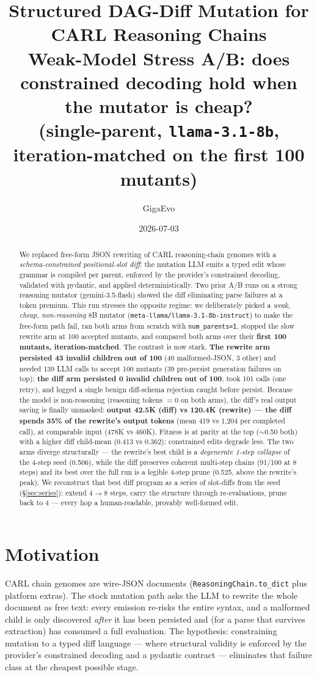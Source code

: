 \documentclass[11pt]{article}
\title{\color{accent}\bfseries Structured DAG-Diff Mutation for CARL Reasoning Chains\\
\large Weak-Model Stress A/B: does constrained decoding hold when the mutator is cheap?\\
\large (single-parent, \texttt{llama-3.1-8b}, iteration-matched on the first 100 mutants)}
\author{GigaEvo}
\date{2026-07-03}
\begin{document}
\maketitle

\begin{abstract}
\noindent
We replaced free-form JSON rewriting of CARL reasoning-chain genomes with a
\emph{schema-constrained positional-slot diff}: the mutation LLM emits a typed edit whose
grammar is compiled per parent, enforced by the provider's constrained decoding, validated
with pydantic, and applied deterministically. Two prior A/B runs on a strong reasoning
mutator (gemini-3.5-flash) showed the diff eliminating parse failures at a token premium.
This run stresses the opposite regime: we deliberately picked a \emph{weak, cheap,
non-reasoning} 8B mutator (\texttt{meta-llama/llama-3.1-8b-instruct}) to make the free-form
path fail, ran both arms from scratch with \texttt{num\_parents=1}, stopped the slow rewrite
arm at 100 accepted mutants, and compared both arms over their \textbf{first 100 mutants,
iteration-matched}. The contrast is now stark. \textbf{The rewrite arm persisted 43 invalid
children out of 100} (40 malformed-JSON, 3 other) and needed 139 LLM calls to accept 100
mutants (39 pre-persist generation failures on top); \textbf{the diff arm persisted 0 invalid
children out of 100}, took 101 calls (one retry), and logged a single benign
diff-schema rejection caught before persist. Because the model is non-reasoning
(reasoning tokens $=0$ on both arms), the diff's real output saving is finally unmasked:
\textbf{output 42.5K (diff) vs 120.4K (rewrite) --- the diff spends 35\% of the rewrite's
output tokens} (mean 419 vs 1{,}204 per completed call), at comparable input (478K vs 460K).
Fitness is at parity at the top ($\sim$0.50 both) with a higher diff child-mean (0.413 vs
0.362): constrained edits degrade less. The two arms diverge structurally --- the rewrite's
best child is a \emph{degenerate 1-step collapse} of the 4-step seed (0.506), while the diff
preserves coherent multi-step chains (91/100 at 8 steps) and its best over the full run is a
legible 4-step prune (0.525, above the rewrite's peak). We reconstruct that best diff program
as a series of slot-diffs from the seed (\S\ref{sec:series}): extend $4\!\to\!8$ steps, carry
the structure through re-evaluations, prune back to 4 --- every hop a human-readable, provably
well-formed edit.
\end{abstract}

\section{Motivation}
CARL chain genomes are wire-JSON documents (\texttt{ReasoningChain.to\_dict} plus platform
extras). The stock mutation path asks the LLM to rewrite the whole document as free text:
every emission re-risks the entire syntax, and a malformed child is only discovered
\emph{after} it has been persisted and (for a parse that survives extraction) has consumed a
full evaluation. The hypothesis: constraining mutation to a typed diff language --- where
structural validity is enforced by the provider's constrained decoding and a pydantic
contract --- eliminates that failure class at the cheapest possible stage.
\end{document}
